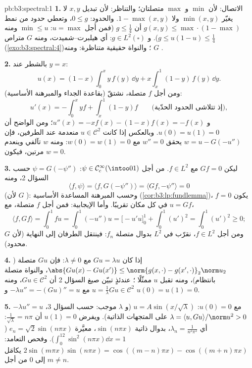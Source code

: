 \begin{solution}{pb:b3:spectral:1}
\textbf{1.} الاتصال: لأن $\min$ و $\max$ متصلتان؛ والتناظر:
لأن تبديل $x, y$ لا يغيّر $\min(x,y)$ ولا $1 -
\max(x,y)$. والحدود:
$0 \leq g$، وتعطي حدود من نمط $g(x,y) \leq
\max\cdot(1-\max)$ أن $g \leq \frac14$ (فمن
أجل $u
= \max$: $\min \leq u$ ومنه $g \leq u(1-u) \leq \frac14$). و $g
\in L^2(\square)$: أي
هيلبرت--شميدت، ومنه $G$ متراص (\cref{exo:b3:spectral:4})؛ والنواة حقيقية
متناظرة: ومنه $G$ .

\textbf{2.} بالشطر عند $y = x$:
\[
u(x) = (1 - x)\int_0^x y\,f(y)\,\dd y +
x\int_x^1(1 - y)\,f(y)\,\dd y .
\]
ومن أجل $f$ متصلة، نشتقّ (بقاعدة الجداء والمبرهنة الأساسية):
\[
u'(x) = -\int_0^xyf + \int_x^1(1-y)f
\qquad\text{(إذ تتلاشى الحدود الحدّية)},
\]
و $u''(x) = -xf(x) - (1 - x)f(x) = -f(x)$؛ ومن الواضح أن $u(0) =
u(1) = 0$. وبالعكس إذا كانت $u \in \mathcal C^2$
منعدمة عند الطرفين، فإن $w = u - G(-u'')$ يحقق $w'' = 0$ مع $w(0) = w(1) =
0$: ومنه
$w$ تآلفي وينعدم مرتين، فيكون $w = 0$.

\textbf{3.} ليكن $Gf = 0$ مع $f \in L^2$. من أجل $\psi \in \mathcal
C_c^\infty(\intoo01)$:
$\psi = G(-\psi'')$ حسب السؤال 2، ومنه
\[
\langle f, \psi\rangle = \langle f, G(-\psi'')\rangle
= \langle Gf, -\psi''\rangle = 0
\]
(لأن $G$ ): وحسب المبرهنة المساعدة الأساسية
(\cref{cor:b3:lp:fundlemma})، يكون $f = 0$ في كل مكان تقريبًا. وأما الإيجابية:
فمن أجل $f$ متصلة، مع $u = Gf$،
\[
\langle f, Gf\rangle = \int_0^1 fu = \int_0^1(-u'')u
= \bigl[-u'u\bigr]_0^1 + \int_0^1(u')^2 = \int_0^1(u')^2
\geq 0 ;
\]
ومن أجل $f \in L^2$، نقرّب في $L^2$ بدوال متصلة $f_n$: فينتقل
الطرفان إلى النهاية (لأن $G$ محدود).

\textbf{4.} إذا كان $Gu = \lambda u$ مع $\lambda \neq 0$: فإن
$Gu$ متصلة ($\abs{Gu(x) - Gu(x')} \leq \norm{g(x,\cdot) -
g(x',\cdot)}_2\norm u_2$، والنواة متصلة بانتظام)، ومنه تقبل $u$
ممثّلًا ؛ عندئذٍ تبيّن صيغ السؤال 2 أن $Gu \in \mathcal C^2$، ومنه
$u =
\frac1\lambda Gu \in \mathcal C^2$ مع $-\lambda u'' =
-(Gu)'' = u$ و $u(0) = u(1) = 0$.

\textbf{5.} $-\lambda u'' = u$ مع $u(0) = 0$: $u = A\sin(x/\sqrt
\lambda)$ (و $\lambda$ موجب:
حسب السؤال 3، $\lambda =
\langle u, Gu\rangle/\norm u^2 > 0$ على المتجهات الذاتية). ويفرض $u(1) =
0$ أن
$\frac1{\sqrt\lambda} = n\pi$: أي $\lambda_n =
\frac1{n^2\pi^2}$، بدوال ذاتية $\sin(n\pi x)$، معيَّرة
$e_n = \sqrt2\sin(n\pi x)$ ($\int_0^12\sin^2(n\pi x)\dd x =
1$). وفحص التعامد: $2\sin(m\pi x)\sin(n\pi x) =
\cos((m-n)\pi x) - \cos((m+n)\pi x)$ يكامَل إلى $0$ من أجل
$m
\neq n$.


\end{solution}

